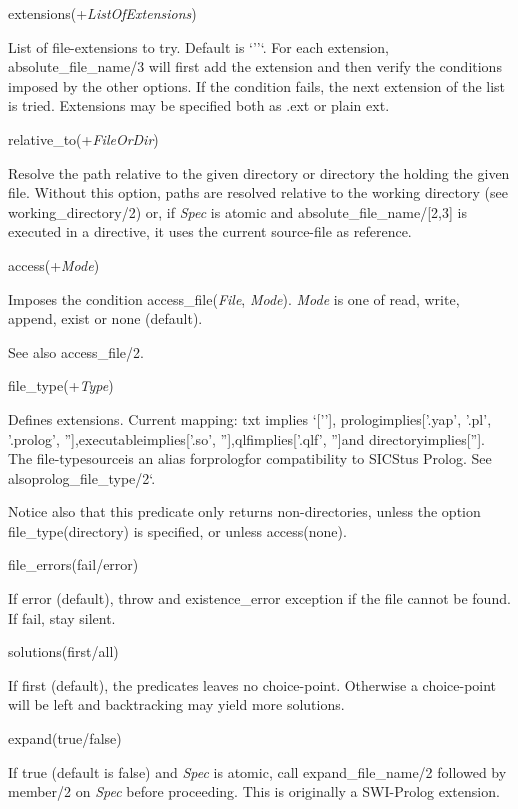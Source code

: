 \begin{DoxyItemize}
\item extensions(+{\itshape List\+Of\+Extensions})

List of file-\/extensions to try. Default is `''`. For each extension, absolute\+\_\+file\+\_\+name/3 will first add the extension and then verify the conditions imposed by the other options. If the condition fails, the next extension of the list is tried. Extensions may be specified both as {\ttfamily .ext} or plain {\ttfamily ext}.
\item relative\+\_\+to(+{\itshape File\+Or\+Dir})

Resolve the path relative to the given directory or directory the holding the given file. Without this option, paths are resolved relative to the working directory (see working\+\_\+directory/2) or, if {\itshape Spec} is atomic and {\ttfamily absolute\+\_\+file\+\_\+name/\mbox{[}2,3\mbox{]}} is executed in a directive, it uses the current source-\/file as reference.
\item access(+{\itshape Mode})

Imposes the condition access\+\_\+file({\itshape File}, {\itshape Mode}). {\itshape Mode} is one of {\ttfamily read}, {\ttfamily write}, {\ttfamily append}, {\ttfamily exist} or {\ttfamily none} (default).

See also {\ttfamily access\+\_\+file/2}.
\item file\+\_\+type(+{\itshape Type})

Defines extensions. Current mapping\+: {\ttfamily txt} implies `\mbox{[}''\mbox{]}{\ttfamily , }prolog{\ttfamily implies}\mbox{[}'.yap', '.pl', '.prolog', ''\mbox{]}{\ttfamily ,}executable{\ttfamily  implies}\mbox{[}'.so', ''\mbox{]}{\ttfamily ,}qlf{\ttfamily implies}\mbox{[}'.qlf', ''\mbox{]}{\ttfamily and }directory{\ttfamily implies}\mbox{[}''\mbox{]}{\ttfamily . The file-\/type}source{\ttfamily  is an alias for}prolog{\ttfamily for compatibility to S\+I\+C\+Stus Prolog. See also}prolog\+\_\+file\+\_\+type/2`.

Notice also that this predicate only returns non-\/directories, unless the option {\ttfamily file\+\_\+type(directory)} is specified, or unless {\ttfamily access(none)}.
\item file\+\_\+errors({\ttfamily fail}/{\ttfamily error})

If {\ttfamily error} (default), throw and {\ttfamily existence\+\_\+error} exception if the file cannot be found. If {\ttfamily fail}, stay silent.
\item solutions({\ttfamily first}/{\ttfamily all})

If {\ttfamily first} (default), the predicates leaves no choice-\/point. Otherwise a choice-\/point will be left and backtracking may yield more solutions.
\item expand({\ttfamily true}/{\ttfamily false})

If {\ttfamily true} (default is {\ttfamily false}) and {\itshape Spec} is atomic, call expand\+\_\+file\+\_\+name/2 followed by member/2 on {\itshape Spec} before proceeding. This is originally a S\+W\+I-\/\+Prolog extension.
\end{DoxyItemize}

